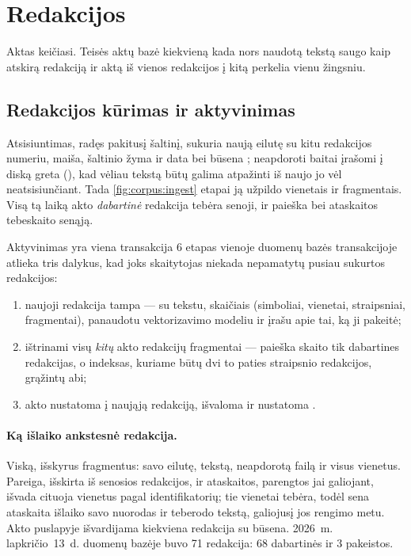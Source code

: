 \section{Redakcijos}\label{sec:corpus:versions}

Aktas keičiasi. Teisės aktų bazė kiekvieną kada nors naudotą tekstą saugo kaip atskirą redakciją
ir aktą iš vienos redakcijos į kitą perkelia vienu žingsniu.

\subsection{Redakcijos kūrimas ir aktyvinimas}\label{sec:corpus:activate}

Atsisiuntimas, radęs pakitusį šaltinį, sukuria naują  eilutę su
kitu redakcijos numeriu, maiša, šaltinio žyma ir data bei būsena ; neapdoroti
baitai įrašomi į diską greta (), kad vėliau tekstą būtų galima atpažinti iš
naujo jo vėl neatsisiunčiant. Tada \cref{fig:corpus:ingest} etapai ją užpildo vienetais ir
fragmentais. Visą tą laiką akto \emph{dabartinė} redakcija tebėra senoji, ir paieška bei
ataskaitos tebeskaito senąją.

\begin{codebox}{Aktyvinimas yra viena transakcija}
 6 etapas vienoje duomenų bazės transakcijoje atlieka tris dalykus, kad joks
skaitytojas niekada nepamatytų pusiau sukurtos redakcijos:
\begin{enumerate}
  \item naujoji redakcija tampa  --- su tekstu, skaičiais (simboliai, vienetai,
    straipsniai, fragmentai), panaudotu vektorizavimo modeliu ir įrašu apie tai, ką ji pakeitė;
  \item ištrinami visų \emph{kitų} akto redakcijų fragmentai --- paieška skaito tik dabartines
    redakcijas, o indeksas, kuriame būtų dvi to paties straipsnio redakcijos, grąžintų abi;
  \item akto  nustatoma į naująją redakciją, 
    išvaloma ir nustatoma .
\end{enumerate}
\end{codebox}

\paragraph{Ką išlaiko ankstesnė redakcija.} Viską, išskyrus fragmentus: savo eilutę, tekstą,
neapdorotą failą ir visus vienetus. Pareiga, išskirta iš senosios redakcijos, ir ataskaitos,
parengtos jai galiojant, išvada cituoja vienetus pagal identifikatorių; tie vienetai tebėra, todėl
sena ataskaita išlaiko savo nuorodas ir teberodo tekstą, galiojusį jos rengimo metu. Akto
puslapyje išvardijama kiekviena redakcija su būsena. 2026~m. lapkričio~13~d. duomenų bazėje buvo
71 redakcija: 68 dabartinės ir 3 pakeistos.

